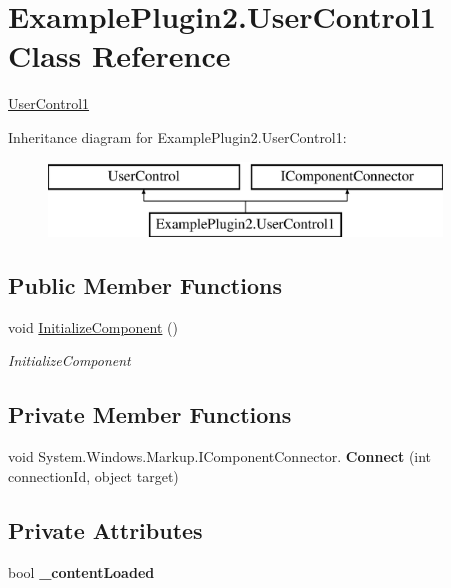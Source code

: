 \hypertarget{class_example_plugin2_1_1_user_control1}{}\section{Example\+Plugin2.\+User\+Control1 Class Reference}
\label{class_example_plugin2_1_1_user_control1}


\mbox{\hyperlink{class_example_plugin2_1_1_user_control1}{User\+Control1}}  


Inheritance diagram for Example\+Plugin2.\+User\+Control1\+:\begin{figure}[H]
\begin{center}
\leavevmode
\includegraphics[height=2.000000cm]{de/dbb/class_example_plugin2_1_1_user_control1}
\end{center}
\end{figure}
\subsection*{Public Member Functions}
\begin{DoxyCompactItemize}
\item 
void \mbox{\hyperlink{class_example_plugin2_1_1_user_control1_ae9a366b4fef6063fc10c44cb83b654cd}{Initialize\+Component}} ()
\begin{DoxyCompactList}\small\item\em Initialize\+Component \end{DoxyCompactList}\end{DoxyCompactItemize}
\subsection*{Private Member Functions}
\begin{DoxyCompactItemize}
\item 
\mbox{\label{class_example_plugin2_1_1_user_control1_a53393a63267fe8e6626af2961580f6a5}} 
void System.\+Windows.\+Markup.\+I\+Component\+Connector. {\bfseries Connect} (int connection\+Id, object target)
\end{DoxyCompactItemize}
\subsection*{Private Attributes}
\begin{DoxyCompactItemize}
\item 
\mbox{\label{class_example_plugin2_1_1_user_control1_aa61852d245f3ee4cfb556f11cbb28dae}} 
bool {\bfseries \+\_\+content\+Loaded}
\end{DoxyCompactItemize}


